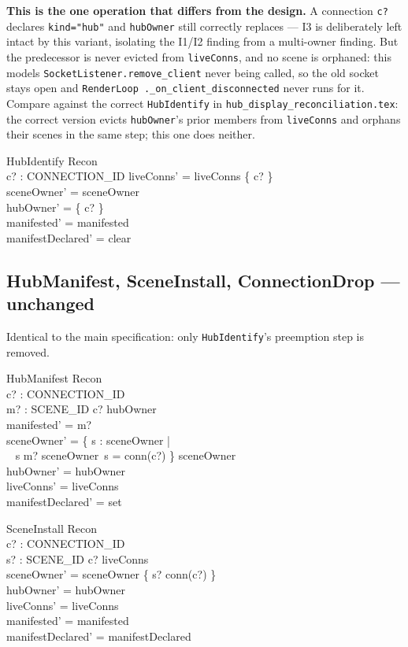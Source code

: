 \documentclass[a4paper,10pt,fleqn]{article}
\begin{document}
\textbf{This is the one operation that differs from the design.}  A
connection \texttt{c?} declares \texttt{kind="hub"} and \texttt{hubOwner}
still correctly replaces --- I3 is deliberately left intact by this
variant, isolating the I1/I2 finding from a multi-owner finding.  But the
predecessor is never evicted from \texttt{liveConns}, and no scene is
orphaned: this models \texttt{SocketListener.remove\_client} never being
called, so the old socket stays open and \texttt{RenderLoop
.\_on\_client\_disconnected} never runs for it.  Compare against the
correct \texttt{HubIdentify} in \texttt{hub\_display\_reconciliation.tex}:
the correct version evicts \texttt{hubOwner}'s prior members from
\texttt{liveConns} and orphans their scenes in the same step; this one
does neither.

\begin{schema}{HubIdentify}
  \Delta Recon \\
  c? : CONNECTION\_ID
\where
  liveConns' = liveConns \cup \{ c? \} \\
  sceneOwner' = sceneOwner \\
  hubOwner' = \{ c? \} \\
  manifested' = manifested \\
  manifestDeclared' = clear
\end{schema}

\subsection{HubManifest, SceneInstall, ConnectionDrop --- unchanged}

Identical to the main specification: only \texttt{HubIdentify}'s
preemption step is removed.

\begin{schema}{HubManifest}
  \Delta Recon \\
  c? : CONNECTION\_ID \\
  m? : \power SCENE\_ID
\where
  c? \in hubOwner \\
  manifested' = m? \\
  sceneOwner' = \{ s : \dom sceneOwner | \\
  \quad~ s \in m? \lor sceneOwner~s = conn(c?) \} \dres sceneOwner \\
  hubOwner' = hubOwner \\
  liveConns' = liveConns \\
  manifestDeclared' = set
\end{schema}

\begin{schema}{SceneInstall}
  \Delta Recon \\
  c? : CONNECTION\_ID \\
  s? : SCENE\_ID
\where
  c? \in liveConns \\
  sceneOwner' = sceneOwner \oplus \{ s? \mapsto conn(c?) \} \\
  hubOwner' = hubOwner \\
  liveConns' = liveConns \\
  manifested' = manifested \\
  manifestDeclared' = manifestDeclared
\end{schema}
\end{document}
